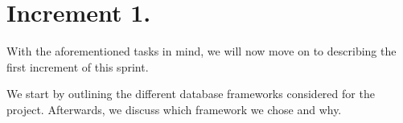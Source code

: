 \section{Increment 1.}
With the aforementioned tasks in mind, we will now move on to describing the first increment of this sprint.

We start by outlining the different database frameworks considered for the project.
Afterwards, we discuss which framework we chose and why.




